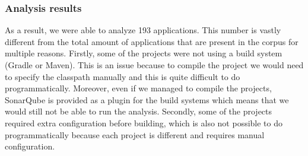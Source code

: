\subsubsection{Analysis results}


As a result, we were able to analyze 193 applications.
This number is vastly different from the total amount of applications that are present in the corpus for multiple reasons.
Firstly, some of the projects were not using a build system (Gradle or Maven).
This is an issue because to compile the project we would need to specify the classpath manually and
this is quite difficult to do programmatically.
Moreover, even if we managed to compile the projects, SonarQube is provided as a plugin for the build systems which means
that we would still not be able to run the analysis.
Secondly, some of the projects required extra configuration before building, which is also not possible to do
programmatically because each project is different and requires manual configuration.
